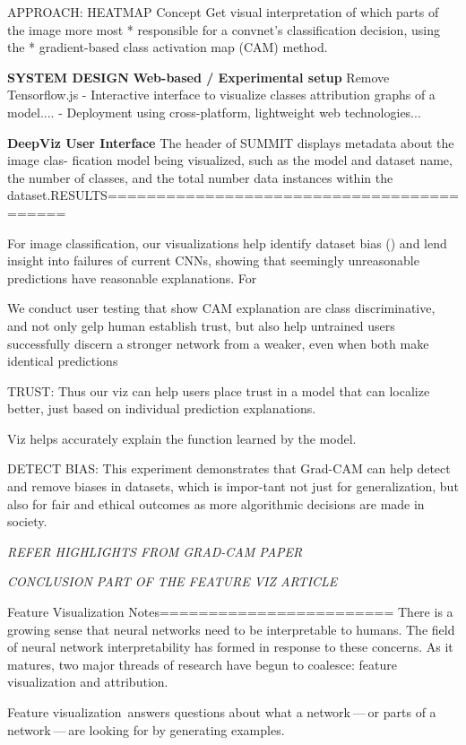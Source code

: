APPROACH: HEATMAP Concept
Get visual interpretation of which parts of the image more most
 *    responsible for a convnet's classification decision, using the
 *    gradient-based class activation map (CAM) method.
 
 \textbf{SYSTEM DESIGN}
 \textbf{Web-based / Experimental setup}
 Remove Tensorflow.js
 - Interactive interface to visualize classes attribution graphs of a model....
 - Deployment using cross-platform, lightweight web technologies...
 
 \textbf{DeepViz User Interface}
  The header of SUMMIT displays metadata about the image clas-
fication model being visualized, such as the model and dataset name, the number of classes, and the total number data instances within the dataset.RESULTS==========================================

For image classification, our visualizations help identify dataset bias () and lend insight into failures of current CNNs, showing that seemingly unreasonable predictions have reasonable explanations. For

We conduct user testing that show CAM explanation are class discriminative, and not only gelp  human establish trust, but also help untrained users successfully discern a stronger network from a weaker, even when both make identical predictions

TRUST: Thus our viz can help users place trust in a model that can localize better, just based on individual prediction explanations.

Viz helps accurately explain the function learned by the model.

DETECT BIAS: This experiment demonstrates that Grad-CAM can
help detect and remove biases in datasets, which is impor-tant not just for generalization, but also for fair and ethical
outcomes as more algorithmic decisions are made in society.

\textit{REFER HIGHLIGHTS FROM GRAD-CAM PAPER}

\textit{CONCLUSION PART OF THE FEATURE VIZ ARTICLE}

Feature Visualization Notes========================
There is a growing sense that neural networks need to be interpretable to humans. The field of neural network interpretability has formed in response to these concerns. As it matures, two major threads of research have begun to coalesce: feature visualization and attribution.

Feature visualization answers questions about what a network — or parts of a network — are looking for by generating examples.

